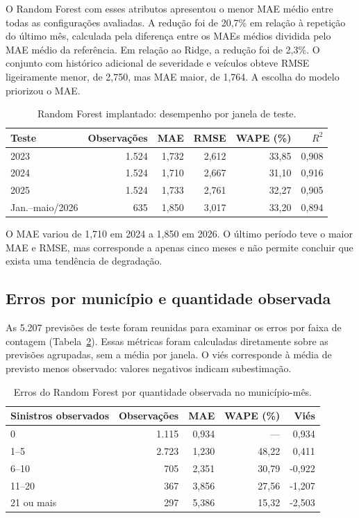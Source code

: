 \documentclass[12pt]{article}
\begin{document}
O Random Forest com esses atributos apresentou o menor MAE médio entre todas as configurações avaliadas. A redução foi de 20,7\% em relação à repetição do último mês, calculada pela diferença entre os MAEs médios dividida pelo MAE médio da referência. Em relação ao Ridge, a redução foi de 2,3\%. O conjunto com histórico adicional de severidade e veículos obteve RMSE ligeiramente menor, de 2,750, mas MAE maior, de 1,764. A escolha do modelo priorizou o MAE.

\begin{table}[ht]
\centering
\caption{Random Forest implantado: desempenho por janela de teste.}
\label{tab:anos}
\begin{tabular}{lrrrrr}
\hline
Teste & Observações & MAE & RMSE & WAPE (\%) & $R^2$ \\
\hline
2023 & 1.524 & 1,732 & 2,612 & 33,85 & 0,908 \\
2024 & 1.524 & 1,710 & 2,667 & 31,10 & 0,916 \\
2025 & 1.524 & 1,733 & 2,761 & 32,27 & 0,905 \\
Jan.--maio/2026 & 635 & 1,850 & 3,017 & 33,20 & 0,894 \\
\hline
\end{tabular}
\end{table}

O MAE variou de 1,710 em 2024 a 1,850 em 2026. O último período teve o maior MAE e RMSE, mas corresponde a apenas cinco meses e não permite concluir que exista uma tendência de degradação.

\subsection{Erros por município e quantidade observada}

As 5.207 previsões de teste foram reunidas para examinar os erros por faixa de contagem (Tabela~\ref{tab:faixas}). Essas métricas foram calculadas diretamente sobre as previsões agrupadas, sem a média por janela. O viés corresponde à média de previsto menos observado: valores negativos indicam subestimação.

\begin{table}[ht]
\centering
\caption{Erros do Random Forest por quantidade observada no município-mês.}
\label{tab:faixas}
\begin{tabular}{lrrrr}
\hline
Sinistros observados & Observações & MAE & WAPE (\%) & Viés \\
\hline
0 & 1.115 & 0,934 & --- & 0,934 \\
1--5 & 2.723 & 1,230 & 48,22 & 0,411 \\
6--10 & 705 & 2,351 & 30,79 & -0,922 \\
11--20 & 367 & 3,856 & 27,56 & -1,207 \\
21 ou mais & 297 & 5,386 & 15,32 & -2,503 \\
\hline
\end{tabular}
\end{table}
\end{document}
